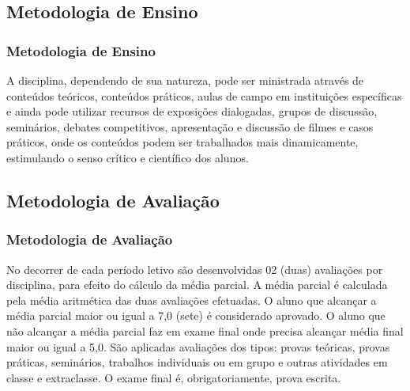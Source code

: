 \subsection[Metodologia de Ensino]{Metodologia de Ensino}\label{subsec:plano-ensino-metodologia}



\begin{frame}[t]\frametitle{Metodologia de Ensino}

  \begin{block}{}
    \justifying{}
    \Large
    A disciplina, dependendo de sua natureza, pode ser ministrada através de conteúdos teóricos, conteúdos práticos, aulas de campo em instituições específicas e ainda pode utilizar recursos de exposições dialogadas, grupos de discussão, seminários, debates competitivos, apresentação e discussão de filmes e casos práticos, onde os conteúdos podem ser trabalhados mais dinamicamente, estimulando o senso crítico e científico dos alunos.
  \end{block}

\end{frame}



\subsection[Metodologia de Avaliação]{Metodologia de Avaliação}\label{subsec:plano-ensino-avaliacao}



\begin{frame}[t]\frametitle{Metodologia de Avaliação}

  \begin{block}{}
    \justifying{}
    \Large
    No decorrer de cada período letivo são desenvolvidas 02 (duas) avaliações por disciplina, para efeito do cálculo da média parcial. A média parcial é calculada pela média aritmética das duas avaliações efetuadas. O aluno que alcançar a média parcial maior ou igual a 7,0 (sete) é considerado aprovado. O aluno que não alcançar a média parcial faz em exame final onde precisa alcançar média final maior ou igual a 5,0. São aplicadas avaliações dos tipos: provas teóricas, provas práticas, seminários, trabalhos individuais ou em grupo e outras atividades em classe e extraclasse. O exame final é, obrigatoriamente, prova escrita.
  \end{block}

\end{frame}



